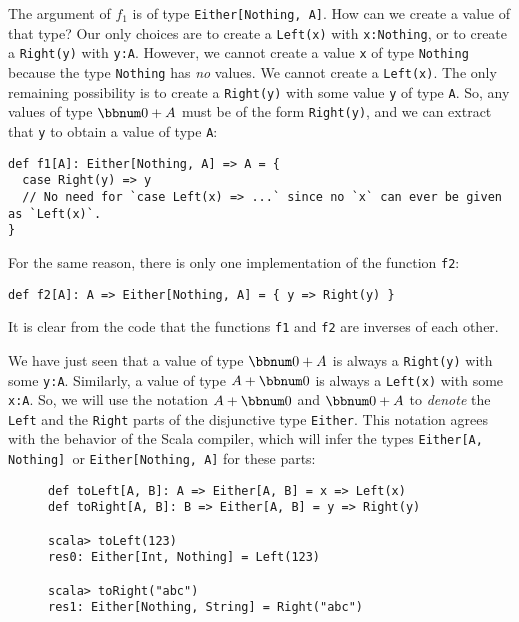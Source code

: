 The argument of $f_{1}$ is of type \lstinline!Either[Nothing, A]!.
How can we create a value of that type? Our only choices are to create
a \lstinline!Left(x)! with \lstinline!x:Nothing!, or to create a
\lstinline!Right(y)! with \lstinline!y:A!. However, we cannot create
a value \lstinline!x! of type \lstinline!Nothing! because the type
\lstinline!Nothing! has \emph{no} values. We cannot create a \lstinline!Left(x)!.
The only remaining possibility is to create a \lstinline!Right(y)!
with some value \lstinline!y! of type \lstinline!A!. So, any values
of type $\bbnum 0+A$ must be of the form \lstinline!Right(y)!, and
we can extract that \lstinline!y! to obtain a value of type \lstinline!A!:
\begin{lstlisting}
def f1[A]: Either[Nothing, A] => A = {
  case Right(y) => y
  // No need for `case Left(x) => ...` since no `x` can ever be given as `Left(x)`.
}
\end{lstlisting}
For the same reason, there is only one implementation of the function
\lstinline!f2!:
\begin{lstlisting}
def f2[A]: A => Either[Nothing, A] = { y => Right(y) }
\end{lstlisting}
It is clear from the code that the functions \lstinline!f1! and \lstinline!f2!
are inverses of each other.

We have just seen that a value of type $\bbnum 0+A$ is always a \lstinline!Right(y)!
with some \lstinline!y:A!. Similarly, a value of type $A+\bbnum 0$
is always a \lstinline!Left(x)! with some \lstinline!x:A!. So, we
will use the notation $A+\bbnum 0$ and $\bbnum 0+A$ to \emph{denote}
the \lstinline!Left! and the \lstinline!Right! parts of the disjunctive
type \lstinline!Either!. This notation agrees with the behavior of
the Scala compiler, which will infer the types \lstinline!Either[A, Nothing] !or
\lstinline!Either[Nothing, A]! for these parts:

\begin{wrapfigure}{l}{0.53\columnwidth}%
\vspace{-0.5\baselineskip}
\begin{lstlisting}
def toLeft[A, B]: A => Either[A, B] = x => Left(x)
def toRight[A, B]: B => Either[A, B] = y => Right(y)

scala> toLeft(123)
res0: Either[Int, Nothing] = Left(123)

scala> toRight("abc")
res1: Either[Nothing, String] = Right("abc")
\end{lstlisting}

\vspace{-2\baselineskip}
\end{wrapfigure}%

